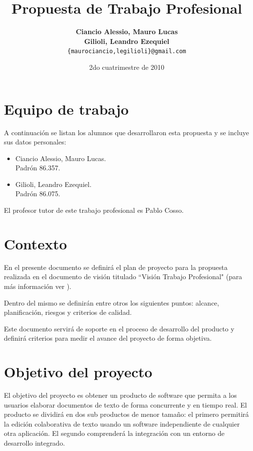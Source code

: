 \documentclass[12pt,a4paper]{article}
\title { \textbf{Propuesta de Trabajo Profesional}}
\date{2do cuatrimestre de 2010}
\author{\textbf{Ciancio Alessio, Mauro Lucas} \\
		\textbf{Gilioli, Leandro Ezequiel}	  \\
		\texttt{\{maurociancio,legilioli\}@gmail.com}
	}
\begin{document}
\maketitle
\tableofcontents
\newpage

	\section{Equipo de trabajo}

A continuación se listan los alumnos que desarrollaron esta propuesta y se incluye sus datos personales:

	\begin{itemize}
		\item Ciancio Alessio, Mauro Lucas. \\
		      Padrón 86.357.
		\item Gilioli, Leandro Ezequiel. \\
		      Padrón 86.075.
	\end{itemize}

El profesor tutor de este trabajo profesional es Pablo Cosso.

	\section{Contexto}

	En el presente documento se definirá el plan de proyecto para la propuesta realizada en el documento de visión titulado ``Visión Trabajo Profesional" (para más información ver \cite{visiontpprof}). 

	Dentro del mismo se definirán entre otros los siguientes puntos: alcance, planificación, riesgos y criterios de calidad. 

	Este documento servirá de soporte en el proceso de desarrollo del producto y definirá criterios para medir el avance del proyecto de forma objetiva.	
		
	\section{Objetivo del proyecto}

El objetivo del proyecto es obtener un producto de software que permita a los usuarios elaborar documentos de texto de forma concurrente y en tiempo real. El producto se dividirá en dos sub productos de menor tamaño: el primero permitirá la edición colaborativa de texto usando un software independiente de cualquier otra aplicación. El segundo comprenderá la integración con un entorno de desarrollo integrado.
\end{document}
